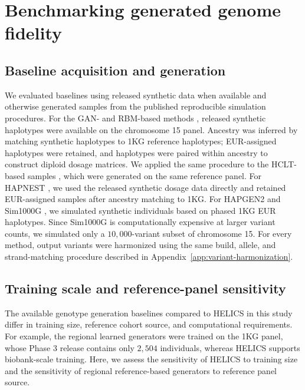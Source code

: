 \documentclass{article}
\begin{document}
\section{Benchmarking generated genome fidelity}
\label{app:benchmarks}

\subsection{Baseline acquisition and generation}

We evaluated baselines using released synthetic data when available and otherwise generated samples from the published reproducible simulation procedures. For the GAN- and RBM-based methods \cite{yelmenGAN}, released synthetic haplotypes were available on the chromosome 15 panel. Ancestry was inferred by matching synthetic haplotypes to 1KG reference haplotypes; EUR-assigned haplotypes were retained, and haplotypes were paired within ancestry to construct diploid dosage matrices. We applied the same procedure to the HCLT-based samples \cite{dang2023HCLTs}, which were generated on the same reference panel. For HAPNEST \cite{wharrie2023hapnest}, we used the released synthetic dosage data directly and retained EUR-assigned samples after ancestry matching to 1KG. For HAPGEN2 \cite{su2011hapgen2} and Sim1000G \cite{dimitromanolakis2019sim1000g}, we simulated synthetic individuals based on phased 1KG EUR haplotypes. Since Sim1000G is computationally expensive at larger variant counts, we simulated only a \(10{,}000\)-variant subset of chromosome 15. For every method, output variants were harmonized using the same build, allele, and strand-matching procedure described in Appendix~\ref{app:variant-harmonization}.




\subsection{Training scale and reference-panel sensitivity}
\label{app:scale_reference}

The available genotype generation baselines compared to HELICS in this study differ in training size, reference cohort source, and computational requirements. For example, the regional learned generators were trained on the 1KG panel, whose Phase 3 release contains only \(2{,}504\) individuals, whereas HELICS supports biobank-scale training. Here, we assess the sensitivity of HELICS to training size and the sensitivity of regional reference-based generators to reference panel source.
\end{document}
